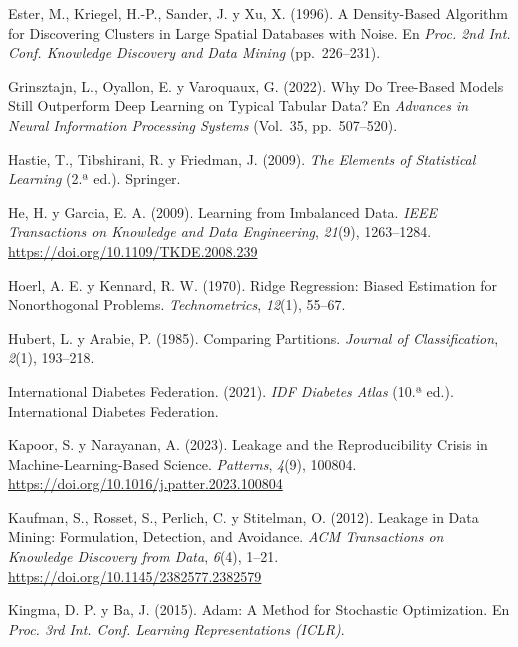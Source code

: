 \documentclass[conference,a4paper]{IEEEtran}
\begin{document}
\begin{thebibliography}{}
Ester, M., Kriegel, H.-P., Sander, J. y Xu, X. (1996). A Density-Based Algorithm for Discovering Clusters in Large Spatial Databases with Noise. En \textit{Proc. 2nd Int. Conf. Knowledge Discovery and Data Mining} (pp.~226–231).

Grinsztajn, L., Oyallon, E. y Varoquaux, G. (2022). Why Do Tree-Based Models Still Outperform Deep Learning on Typical Tabular Data? En \textit{Advances in Neural Information Processing Systems} (Vol.~35, pp.~507–520).

Hastie, T., Tibshirani, R. y Friedman, J. (2009). \textit{The Elements of Statistical Learning} (2.ª ed.). Springer.

He, H. y Garcia, E. A. (2009). Learning from Imbalanced Data. \textit{IEEE Transactions on Knowledge and Data Engineering}, \textit{21}(9), 1263–1284. \url{https://doi.org/10.1109/TKDE.2008.239}

Hoerl, A. E. y Kennard, R. W. (1970). Ridge Regression: Biased Estimation for Nonorthogonal Problems. \textit{Technometrics}, \textit{12}(1), 55–67.

Hubert, L. y Arabie, P. (1985). Comparing Partitions. \textit{Journal of Classification}, \textit{2}(1), 193–218.

International Diabetes Federation. (2021). \textit{{IDF} Diabetes Atlas} (10.ª ed.). International Diabetes Federation.

Kapoor, S. y Narayanan, A. (2023). Leakage and the Reproducibility Crisis in Machine-Learning-Based Science. \textit{Patterns}, \textit{4}(9), 100804. \url{https://doi.org/10.1016/j.patter.2023.100804}

Kaufman, S., Rosset, S., Perlich, C. y Stitelman, O. (2012). Leakage in Data Mining: Formulation, Detection, and Avoidance. \textit{ACM Transactions on Knowledge Discovery from Data}, \textit{6}(4), 1–21. \url{https://doi.org/10.1145/2382577.2382579}

Kingma, D. P. y Ba, J. (2015). Adam: A Method for Stochastic Optimization. En \textit{Proc. 3rd Int. Conf. Learning Representations (ICLR)}.


\end{thebibliography}
\end{document}
